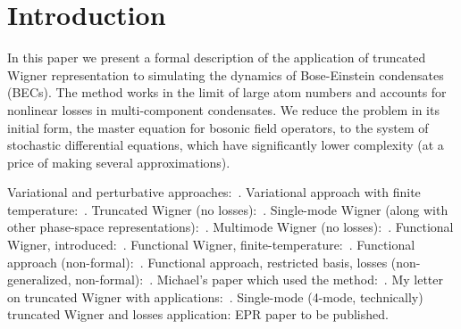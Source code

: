 \section{Introduction}


In this paper we present a formal description of the application of truncated Wigner representation to simulating the dynamics of Bose-Einstein condensates (BECs).
The method works in the limit of large atom numbers and accounts for nonlinear losses in multi-component condensates.
We reduce the problem in its initial form, the master equation for bosonic field operators, to the system of stochastic differential equations, which have significantly lower complexity (at a price of making several approximations).


Variational and perturbative approaches:~\cite{Li2009,Sakmann2009,Sinatra2011}.
Variational approach with finite temperature:~\cite{Li2008}.
Truncated Wigner (no losses):~\cite{Drummond1993,Steel1998,Sinatra2002}.
Single-mode Wigner (along with other phase-space representations):~\cite{Gardiner2004}.
Multimode Wigner (no losses):~\cite{Norrie2005,Norrie2006,Deuar2007}.
Functional Wigner, introduced:~\cite{Graham1970,Graham1970a}.
Functional Wigner, finite-temperature:~\cite{Steel1998,Isella2006}.
Functional approach (non-formal):~\cite{Norrie2006}.
Functional approach, restricted basis, losses (non-generalized, non-formal):~\cite{Norrie2006a}.
Michael's paper which used the method:~\cite{Egorov2011}.
My letter on truncated Wigner with applications:~\cite{Opanchuk2012}.
Single-mode (4-mode, technically) truncated Wigner and losses application: EPR paper to be published.
